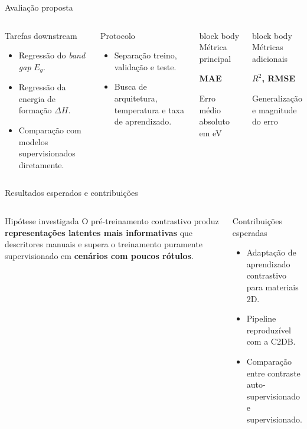 \documentclass[aspectratio=169,10pt]{beamer}
\newcommand{\smallsource}[1]{{\vspace{1mm}\tiny\color{ResearchGray}#1}}
\newcommand{\metric}[3]{%
  \begin{beamercolorbox}[rounded=true,sep=1.1ex,wd=\linewidth]{block body}
    {\scriptsize\color{ResearchGray}#1}\par\vspace{2mm}
    {\Large\bfseries\color{ResearchGreenDark}#2}\par\vspace{1mm}
    {\scriptsize #3}
  \end{beamercolorbox}}
\newcommand{\tightitem}{\setlength{\itemsep}{3pt}\setlength{\parskip}{0pt}}
\begin{document}
\begin{frame}{Avaliação proposta}
\begin{columns}[T,onlytextwidth]
  \begin{block}{Tarefas downstream}
  \begin{itemize}\tightitem
    \item Regressão do \emph{band gap} $E_g$.
    \item Regressão da energia de formação $\Delta H$.
    \item Comparação com modelos supervisionados diretamente.
  \end{itemize}
  \end{block}
  \vspace{1.5mm}
  \begin{block}{Protocolo}
  \begin{itemize}\tightitem
    \item Separação treino, validação e teste.
    \item Busca de arquitetura, temperatura e taxa de aprendizado.
  \end{itemize}
  \end{block}
  \metric{Métrica principal}{MAE}{Erro médio absoluto em eV}
  \vspace{2mm}
  \metric{Métricas adicionais}{$R^2$, RMSE}{Generalização e magnitude do erro}
\end{columns}
\end{frame}

\begin{frame}{Resultados esperados e contribuições}
\begin{columns}[T,onlytextwidth]
  \begin{block}{Hipótese investigada}
  O pré-treinamento contrastivo produz \textbf{representações latentes mais informativas} que descritores manuais e supera o treinamento puramente supervisionado em \textbf{cenários com poucos rótulos}.
  \end{block}
  \begin{block}{Contribuições esperadas}
  \begin{itemize}\tightitem
    \item Adaptação de aprendizado contrastivo para materiais 2D.
    \item Pipeline reproduzível com a C2DB.
    \item Comparação entre contraste auto-supervisionado e supervisionado.
  \end{itemize}
  \end{block}
\end{columns}
\vspace{4mm}
\centering
\end{frame}
\end{document}
